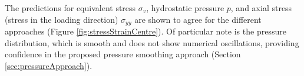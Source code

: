 \documentclass[sn-mathphys,Numbered,draft]{sn-jnl}%
\begin{document}

The predictions for equivalent stress $\sigma_v$, hydrostatic pressure $p$, and axial stress (stress in the loading direction) $\sigma_{yy}$ are shown to agree for the different approaches (Figure \ref{fig:stressStrainCentre}).
Of particular note is the pressure distribution, which is smooth and does not show numerical oscillations, providing confidence in the proposed pressure smoothing approach (Section \ref{sec:pressureApproach}).
\end{document}
